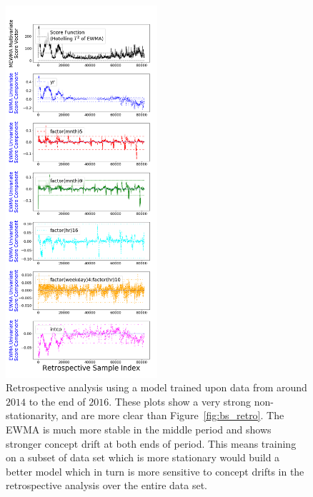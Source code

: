 \documentclass[twoside,11pt]{article}
\begin{document}
\begin{figure}[!htbp]
    \centering
         \includegraphics[width=0.5\textwidth, trim=.0in .4in .4in 1.2in, clip]{../figures/v14/bike_sharing/reg_lin_cat_syr_10_tr_exp/PII_pos_single_retro_bike_fisher_mlines_with_regu_1e-08_0_0001_0_01_99_99.png}
     \caption{Retrospective analysis using a model trained upon data from around $2014$ to the end of $2016$. These plots show a very strong non-stationarity, and are more clear than Figure~\ref{fig:bs_retro}. The EWMA is much more stable in the middle period and shows stronger concept drift at both ends of period. This means training on a subset of data set which is more stationary would build a better model which in turn is more sensitive to concept drifts in the retrospective analysis over the entire data set.}
     \label{fig:bs_retro_mid}
\end{figure}
\end{document}
